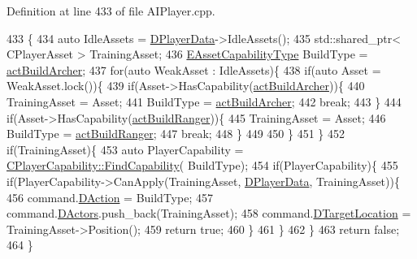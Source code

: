 Definition at line 433 of file A\+I\+Player.\+cpp.


\begin{DoxyCode}
433                                                          \{
434     \textcolor{keyword}{auto} IdleAssets = \hyperlink{classCAIPlayer_a83b5113c8f7e80df54940b647c5ee2e6}{DPlayerData}->IdleAssets();
435     std::shared\_ptr< CPlayerAsset > TrainingAsset;
436     \hyperlink{GameDataTypes_8h_a35b98ce26aca678b03c6f9f76e4778ce}{EAssetCapabilityType} BuildType = \hyperlink{GameDataTypes_8h_a35b98ce26aca678b03c6f9f76e4778ceae3af0123db77607fb381df7e49c5b48b}{actBuildArcher};
437     \textcolor{keywordflow}{for}(\textcolor{keyword}{auto} WeakAsset : IdleAssets)\{
438         \textcolor{keywordflow}{if}(\textcolor{keyword}{auto} Asset = WeakAsset.lock())\{
439             \textcolor{keywordflow}{if}(Asset->HasCapability(\hyperlink{GameDataTypes_8h_a35b98ce26aca678b03c6f9f76e4778ceae3af0123db77607fb381df7e49c5b48b}{actBuildArcher}))\{
440                 TrainingAsset = Asset;
441                 BuildType = \hyperlink{GameDataTypes_8h_a35b98ce26aca678b03c6f9f76e4778ceae3af0123db77607fb381df7e49c5b48b}{actBuildArcher};
442                 \textcolor{keywordflow}{break};
443             \}
444             \textcolor{keywordflow}{if}(Asset->HasCapability(\hyperlink{GameDataTypes_8h_a35b98ce26aca678b03c6f9f76e4778cead539d31a3eb945161800e6342a05fb11}{actBuildRanger}))\{
445                 TrainingAsset = Asset;
446                 BuildType = \hyperlink{GameDataTypes_8h_a35b98ce26aca678b03c6f9f76e4778cead539d31a3eb945161800e6342a05fb11}{actBuildRanger};
447                 \textcolor{keywordflow}{break};
448             \}
449             
450         \}
451     \}
452     \textcolor{keywordflow}{if}(TrainingAsset)\{
453         \textcolor{keyword}{auto} PlayerCapability = \hyperlink{classCPlayerCapability_a881ba4b87385d7cfe5cb6ced2d26f226}{CPlayerCapability::FindCapability}(
      BuildType); 
454         \textcolor{keywordflow}{if}(PlayerCapability)\{
455             \textcolor{keywordflow}{if}(PlayerCapability->CanApply(TrainingAsset, \hyperlink{classCAIPlayer_a83b5113c8f7e80df54940b647c5ee2e6}{DPlayerData}, TrainingAsset))\{
456                 command.\hyperlink{structSPlayerCommandRequest_a80897bbccf2c4e0b148a7aa815a926c6}{DAction} = BuildType;
457                 command.\hyperlink{structSPlayerCommandRequest_aa37fc01519676345703d78b9f573894a}{DActors}.push\_back(TrainingAsset);       
458                 command.\hyperlink{structSPlayerCommandRequest_a701702b94ca2fd2738e95ef6711dd41a}{DTargetLocation} = TrainingAsset->Position();
459                 \textcolor{keywordflow}{return} \textcolor{keyword}{true};
460             \}
461         \}
462     \}
463     \textcolor{keywordflow}{return} \textcolor{keyword}{false};
464 \}
\end{DoxyCode}
